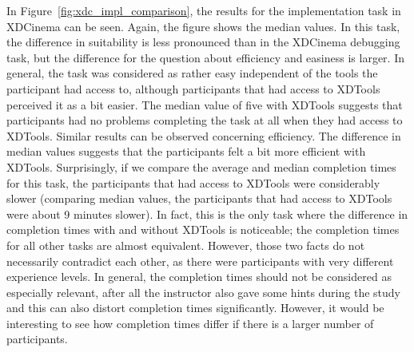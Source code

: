 In Figure~\ref{fig:xdc_impl_comparison}, the results for the implementation task in XDCinema can be seen. Again, the figure shows the median values. In this task, the difference in suitability is less pronounced than in the XDCinema debugging task, but the difference for the question about efficiency and easiness is larger. In general, the task was considered as rather easy independent of the tools the participant had access to, although participants that had access to XDTools perceived it as a bit easier. The median value of five with XDTools suggests that participants had no problems completing the task at all when they had access to XDTools. Similar results can be observed concerning efficiency. The difference in median values suggests that the participants felt a bit more efficient with XDTools. Surprisingly, if we compare the average and median completion times for this task, the participants that had access to XDTools were considerably slower (comparing median values, the participants that had access to XDTools were about 9 minutes slower). In fact, this is the only task where the difference in completion times with and without XDTools is noticeable; the completion times for all other tasks are almost equivalent. However, those two facts do not necessarily contradict each other, as there were participants with very different experience levels. In general, the completion times should not be considered as especially relevant, after all the instructor also gave some hints during the study and this can also distort completion times significantly. However, it would be interesting to see how completion times differ if there is a larger number of participants. 

